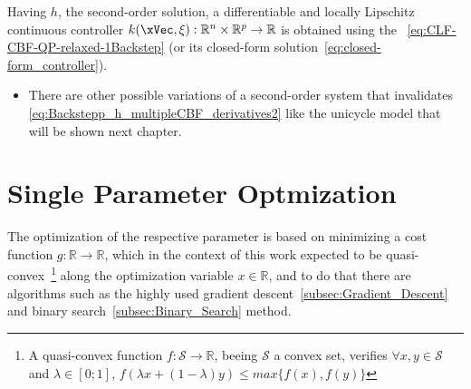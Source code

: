 Having  \(h\), the second-order solution, a differentiable and locally Lipschitz continuous controller \(k(\xVec, \mathbf{\xi}): \mathbb{R}^n \times \mathbb{R}^p \to \mathbb{R}\) is obtained using the ~\eqref{eq:CLF-CBF-QP-relaxed-1Backstep} (or its closed-form solution~\eqref{eq:closed-form_controller}). \\

\begin{tcolorbox}[colback=blue!5!white,colframe=blue!35!white,title=Notes:]
\begin{itemize}
    \item There are other possible variations of a second-order system that invalidates \eqref{eq:Backstepp_h_multipleCBF_derivatives2} like the unicycle model that will be shown next chapter.
\end{itemize}
\end{tcolorbox} 



\newpage %




\section{Single Parameter Optmization}
\label{sec:Single_Parameter_Optmization}


The optimization of the respective parameter is based on minimizing a cost function \(g:\mathbb{R} \to \mathbb{R}\), which in the context of this work expected to be quasi-convex~\footnote{ A quasi-convex function \(f:\mathcal{S} \to \mathbb{R}\), beeing \(\mathcal{S}\) a convex set, verifies \(\forall x,y \in \mathcal{S}\) and \(\lambda \in [0;1]\), \(f(\lambda x + (1-\lambda)y) \leq max\{f(x), f(y)\}\)   } along the optimization variable \(x \in \mathbb{R}\), and to do that there are algorithms such as the highly used gradient descent~\ref{subsec:Gradient_Descent}  and binary search~\ref{subsec:Binary_Search} method.



